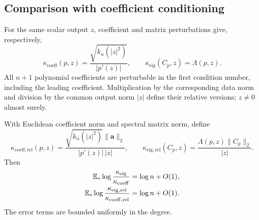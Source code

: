\subsection{Comparison with coefficient conditioning}

For the same scalar output $z$, coefficient and matrix perturbations
give, respectively,
\[
  \kappa_{\mathrm{coeff}}(p,z)
     =\frac{\sqrt{k_n(|z|^2)}}{|p'(z)|},
  \qquad
  \kappa_{\mathrm{eig}}(C_p,z)=\Lambda(p,z).
\]
All $n+1$ polynomial coefficients are perturbable in the first
condition number, including the leading coefficient.  Multiplication
by the corresponding data norm and division by the common output norm
$|z|$ define their relative versions; $z\ne0$ almost surely.

\begin{corollary}\label{cor:comp-relative}
With Euclidean coefficient norm and spectral matrix norm, define
\[
  \kappa_{\mathrm{coeff,rel}}(p,z)
    =\frac{\sqrt{k_n(|z|^2)}\|\mathbf a\|_2}{|p'(z)|\,|z|},
  \qquad
  \kappa_{\mathrm{eig,rel}}(C_p,z)
    =\frac{\Lambda(p,z)\|C_p\|_2}{|z|}.
\]
Then
\begin{align*}
  \mathbb E_*\log\frac{\kappa_{\mathrm{eig}}}{\kappa_{\mathrm{coeff}}}
    &=\log n+O(1),\\
  \mathbb E_*\log\frac{\kappa_{\mathrm{eig,rel}}}
                          {\kappa_{\mathrm{coeff,rel}}}
    &=\log n+O(1).
\end{align*}
The error terms are bounded uniformly in the degree.
\end{corollary}


